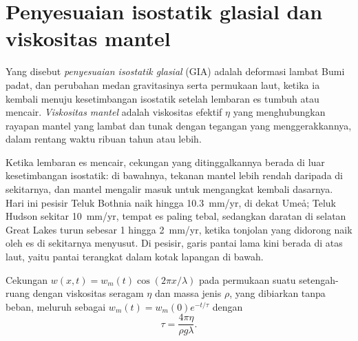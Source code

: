 \section{Penyesuaian isostatik glasial dan viskositas mantel}\label{sec:b3:mantle-convection:gia}

\begin{definition}\label{def:b3:mantle-convection:gia}
Yang disebut \emph{penyesuaian isostatik glasial} (GIA)
adalah deformasi lambat Bumi padat, dan perubahan
medan gravitasinya serta permukaan laut, ketika ia kembali menuju kesetimbangan isostatik setelah
lembaran es tumbuh atau mencair. \emph{Viskositas mantel}
adalah viskositas efektif $\eta$ yang menghubungkan rayapan mantel yang lambat dan tunak
dengan tegangan yang menggerakkannya, dalam rentang waktu ribuan tahun atau lebih.
\end{definition}

Ketika lembaran es mencair, cekungan yang ditinggalkannya berada di luar
kesetimbangan isostatik: di bawahnya, tekanan mantel lebih rendah daripada di sekitarnya, dan
mantel mengalir masuk untuk mengangkat kembali dasarnya. Hari ini pesisir Teluk Bothnia
naik hingga \qty{10.3}{mm/yr}, di dekat Umeå; Teluk Hudson sekitar
\qty{10}{mm/yr}, tempat es paling tebal, sedangkan daratan di selatan Great
Lakes turun sebesar 1 hingga \qty{2}{mm/yr}, ketika tonjolan yang didorong naik oleh es
di sekitarnya menyusut. Di pesisir, garis pantai lama kini berada di atas laut, yaitu
pantai terangkat dalam kotak lapangan di bawah.

\begin{theorem}\label{thm:b3:mantle-convection:relaxation}
Cekungan $w(x, t) = w_m(t)\cos(2\pi x/\lambda)$ pada permukaan suatu setengah-ruang
dengan viskositas seragam $\eta$ dan massa jenis $\rho$, yang dibiarkan tanpa beban,
meluruh sebagai $w_m(t) = w_m(0)e^{-t/\tau}$ dengan
\[
  \tau = \frac{4\pi\eta}{\rho g\lambda} .
\]
\end{theorem}

